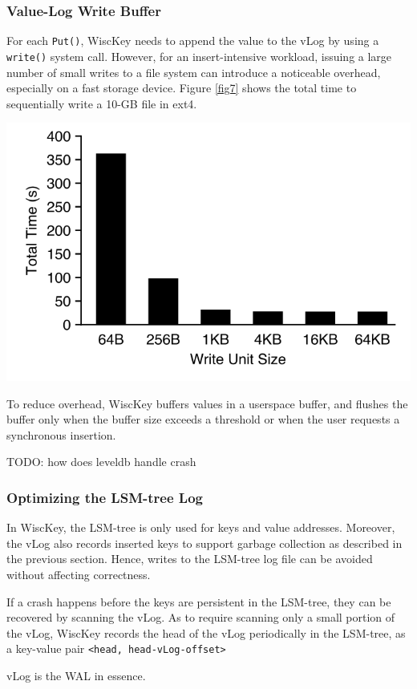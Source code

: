 \documentclass[11pt]{article}
\begin{document}
\subsubsection{Value-Log Write Buffer}
\label{sec:org4c47d64}
For each \texttt{Put()}, WiscKey needs to append the value to the vLog by using a \texttt{write()} system call. However,
for an insert-intensive workload, issuing a large number of small writes to a ﬁle system can introduce
a noticeable overhead, especially on a fast storage device. Figure \ref{fig7} shows the total time to
sequentially write a 10-GB file in ext4.
\begin{center}
\includegraphics[width=.7\textwidth]{../../images/db/17.png}
\end{center}

To reduce overhead, WiscKey buffers values in a userspace buffer, and ﬂushes the buffer only when the
buffer size exceeds a threshold or when the user requests a synchronous insertion.

TODO: how does leveldb handle crash
\subsubsection{Optimizing the LSM-tree Log}
\label{sec:org946f38f}
In WiscKey, the LSM-tree is only used for keys and value addresses. Moreover, the vLog also records
inserted keys to support garbage collection as described in the previous section. Hence, writes to the
LSM-tree log ﬁle can be avoided without affecting correctness.

If a crash happens before the keys are persistent in the LSM-tree, they can be recovered by scanning
the vLog.
As to require scanning only a small portion of the vLog, WiscKey records the head of the vLog
periodically in the LSM-tree, as a key-value pair \texttt{<head, head-vLog-offset>}

vLog is the WAL in essence.
\end{document}
